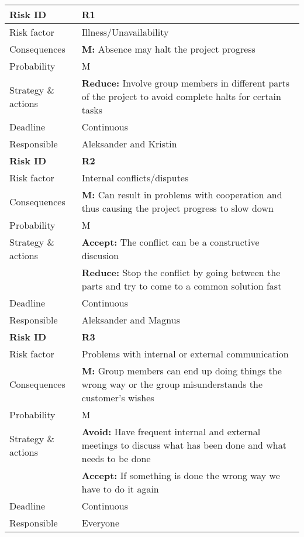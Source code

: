
\begin{longtable}{>{\setlength\hsize{.3\hsize}}X|>{\setlength\hsize{0.7\hsize}}X}\hline
\textbf{Risk ID} & \textbf{R1} \\ \hline \hline
Risk factor & Illness/Unavailability \\
Consequences & \textbf{M:} Absence may halt the project progress \\
Probability & M \\
Strategy \& actions & \textbf{Reduce:} Involve group members in different parts of the project to avoid complete halts for certain tasks \\
Deadline & Continuous \\
Responsible & Aleksander and Kristin \\ \hline

\newpage

\hline
\textbf{Risk ID} & \textbf{R2} \\ \hline \hline
Risk factor & Internal conflicts/disputes \\
Consequences & \textbf{M:} Can result in problems with cooperation and thus causing the project progress to slow down \\
Probability & M \\
Strategy \& actions & \textbf{Accept:} The conflict can be a constructive discusion\\
 & \textbf{Reduce:} Stop the conflict by going between the parts and try to come to a common solution fast \\
Deadline & Continuous \\
Responsible & Aleksander and Magnus\\ \hline

\textbf{Risk ID} & \textbf{R3} \\ \hline \hline
Risk factor & Problems with internal or external communication \\
Consequences & \textbf{M:} Group members can end up doing things the wrong way or the group misunderstands the customer's wishes \\
Probability & M \\
Strategy \& actions & \textbf{Avoid:} Have frequent internal and external meetings to discuss what has been done and what needs to be done\\
 & \textbf{Accept:} If something is done the wrong way we have to do it again \\
Deadline & Continuous \\
Responsible & Everyone \\ \hline


\end{longtable}
